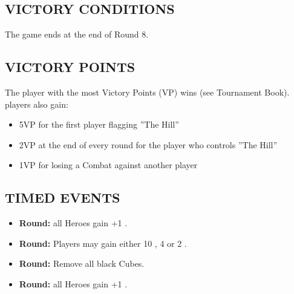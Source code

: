 \begin{multicols*}{2}
\subsection*{\MakeUppercase{Victory Conditions}}
The game ends at the end of Round 8.

\subsection*{\MakeUppercase{Victory Points}}
The player with the most Victory Points (VP) wins (see Tournament Book). players also gain:
\begin{itemize}
  \item 5VP for the first player flagging ''The Hill''
  \item 2VP at the end of every round for the player who controls ''The Hill''
  \item 1VP for losing a Combat against another player
\end{itemize}

\subsection*{\MakeUppercase{Timed Events}}

\begin{itemize}
  \item \textbf{ Round:} all Heroes gain +1 .
  \item \textbf{ Round:} Players may gain either 10 , 4  or 2 .
  \item \textbf{ Round:} Remove all black Cubes.
  \item \textbf{ Round:} all Heroes gain +1 .
\end{itemize}


\end{multicols*}
